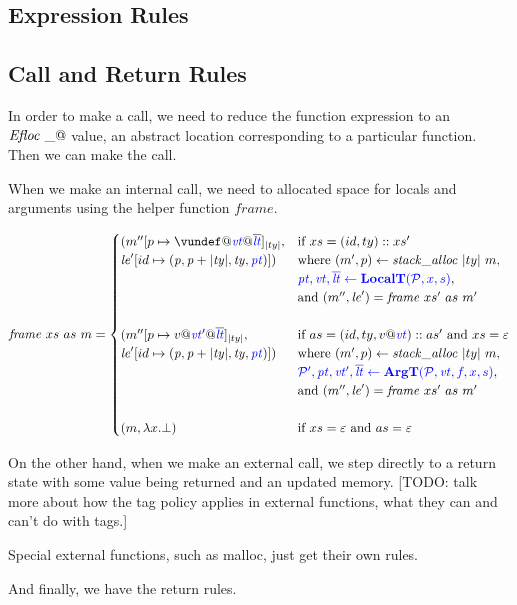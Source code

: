 \documentclass[acmsmall,review,anonymous]{acmart}\settopmatter{printfolios=true,printccs=false,printacmref=false}
\begin{document}
\subsection{Expression Rules}

\expressions

\subsection{Call and Return Rules}

In order to make a call, we need to reduce the function expression to an \(\mathit{Efloc} ~ \_@\) value, an
abstract location corresponding to a particular function. Then we can make the call.

\callexprstep

When we make an internal call, we need to allocated space for locals and arguments using the helper function
\(\mathit{frame}\).

\[\mathit{frame} ~ xs ~ as ~ \mem =
\begin{cases}
  (\mem''[p \mapsto \vundef@\vt@\overline{\lt}]_{|ty|}, & \textnormal{if } xs = (id,ty)::xs' \\
  \lenv'[id \mapsto (\mathit{p, p+|ty|,ty,\pt})]) &
  \textnormal{where } (\mem',p) \leftarrow \mathit{stack\_alloc} ~ |ty| ~ \mem, \\
  & \trule{\localtres}{\localt}, \\
  & \textnormal{and } (\mem'',\lenv') = \mathit{frame} ~ xs' ~ as ~ m' \\ 
  \\
  (\mem''[p \mapsto v@\vt'@\overline{\lt}]_{|ty|}, & \textnormal{if } as = (id,ty,v @ \vt)::as' \textnormal{ and } xs = \varepsilon \\
  \lenv'[id \mapsto (\mathit{p, p+|ty|,ty,\pt})]) &
  \textnormal{where } (\mem',p) \leftarrow \mathit{stack\_alloc} ~ |ty| ~ \mem, \\
  & \trule{\argtres}{\argt}, \\
  & \textnormal{and } (\mem'',\lenv') = \mathit{frame} ~ xs' ~ as ~ m' \\
  \\
  (\mem, \lambda x . \bot) & \textnormal{if } xs = \varepsilon \textnormal{ and } as = \varepsilon \\
\end{cases}\]

\callstep

On the other hand, when we make an external call, we step directly to a return state with some value
being returned and an updated memory. [TODO: talk more about how the tag policy applies in external
  functions, what they can and can't do with tags.]

\extcallstep

Special external functions, such as malloc, just get their own rules.

\mallocstep

And finally, we have the return rules.

\returnstep
\retvalstep
\retnovalstep
\end{document}
